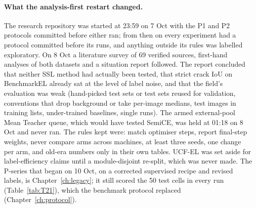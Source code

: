 \paragraph{What the analysis-first restart changed.} The research repository was started at 23:59 on 7 Oct with the P1 and P2
protocols committed before either ran; from then on every experiment had a protocol committed before its runs, and anything outside its
rules was labelled exploratory. On 8 Oct a literature survey of 69 verified sources, first-hand analyses of both datasets and a
situation report followed. The report concluded that neither SSL method had actually been tested, that strict crack IoU on BenchmarkEL
already sat at the level of label noise, and that the field's evaluation was weak (hand-picked test sets or test sets reused for validation,
conventions that drop background or take per-image medians, test images in training lists, under-trained baselines, single runs). The armed external-pool Mean Teacher
queue, which would have tested SemiCE, was held at 01:18 on 8 Oct and never ran. The rules kept were: match optimiser steps, report
final-step weights, never compare arms across machines, at least three seeds, one change per arm, and old-era numbers only in their own
tables. UCF-EL was set aside for label-efficiency claims until a module-disjoint re-split, which was never made. The P-series that began
on 10 Oct, on a corrected supervised recipe and revised labels, is Chapter~\ref{ch:legacy}; it still scored the 50 test cells in every
run (Table~\ref{tab:T21}), which the benchmark protocol replaced (Chapter~\ref{ch:protocol}).
